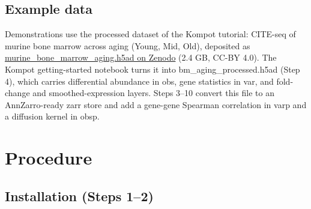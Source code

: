 \subsection{Example data}

Demonstrations use the processed dataset of the Kompot tutorial: CITE-seq of murine bone marrow across aging (Young, Mid, Old), deposited as \href{https://doi.org/10.5281/zenodo.15587768}{murine\_bone\_marrow\_aging.h5ad on Zenodo} (2.4 GB, CC-BY 4.0). The Kompot getting-started notebook turns it into bm\_aging\_processed.h5ad (Step 4), which carries differential abundance in obs, gene statistics in var, and fold-change and smoothed-expression layers. Steps 3--10 convert this file to an AnnZarro-ready zarr store and add a gene-gene Spearman correlation in varp and a diffusion kernel in obsp.

\section{Procedure}

\subsection{Installation (Steps 1--2)}

